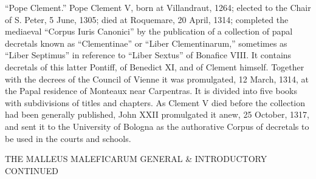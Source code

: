            “Pope Clement.” Pope Clement V, born at Villandraut, 1264; elected to the Chair of S.
        Peter, 5 June, 1305; died at Roquemare, 20 April, 1314; completed the mediaeval “Corpus
        Iuris Canonici” by the publication of a collection of papal decretals known as
        “Clementinae” or “Liber Clementinarum,” sometimes as “Liber Septimus” in reference to
        “Liber Sextus” of Bonafice VIII. It contains decretals of this latter Pontiff, of Benedict XI,
        and of Clement himself. Together with the decrees of the Council of Vienne it was
        promulgated, 12 March, 1314, at the Papal residence of Monteaux near Carpentras. It is
        divided into five books with subdivisions of titles and chapters. As Clement V died before the
        collection had been generally published, John XXII promulgated it anew, 25 October, 1317,
        and sent it to the University of Bologna as the authorative Corpus of decretals to be used in
        the courts and schools.




                                  THE
                          MALLEUS MALEFICARUM
                                         GENERAL & INTRODUCTORY CONTINUED

